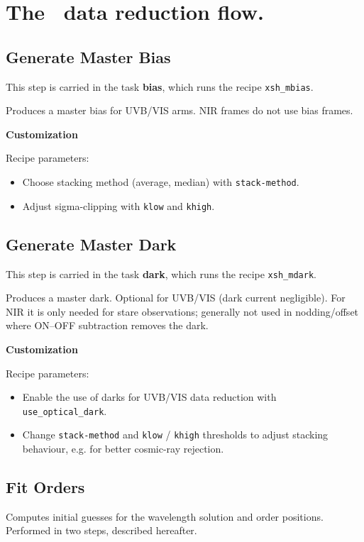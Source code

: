 \section{The \instname\ data reduction flow.}
\label{sec:reduction_flow}



\subsection{Generate Master Bias}
This step is carried in the task {\bf bias}, which runs the recipe  {\tt xsh\_mbias}.

Produces a master bias for UVB/VIS arms. NIR frames do not use bias frames.

\bigskip
{\bf Customization}
\bigskip

Recipe parameters:
\begin{itemize}
\item Choose stacking method (average, median) with {\tt stack-method}.
\item Adjust sigma-clipping with {\tt klow} and {\tt khigh}.
\end{itemize}

\subsection{Generate Master Dark}
This step is carried in the task {\bf dark}, which runs the recipe  {\tt xsh\_mdark}.

Produces a master dark.
Optional for UVB/VIS (dark current negligible).
For NIR it is only needed for stare observations; 
generally not used in nodding/offset where ON--OFF subtraction removes the dark. 

\bigskip
{\bf Customization}
\bigskip

Recipe parameters:
\begin{itemize}
\item Enable the use of darks for UVB/VIS data reduction with {\tt use\_optical\_dark}.
\item Change {\tt stack-method} and {\tt klow} / {\tt khigh} thresholds to adjust stacking behaviour, e.g. for better cosmic-ray rejection.
\end{itemize}

\subsection{Fit Orders}

Computes initial guesses for the wavelength solution and order positions.
Performed in two steps, described hereafter.

